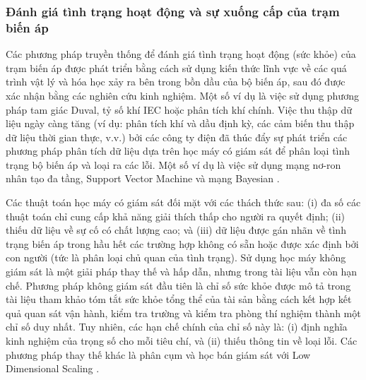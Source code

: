 \documentclass[utf8]{frontiersSCNS} %
\begin{document}
\subsubsection{Đánh giá tình trạng hoạt động và sự xuống cấp của trạm biến áp}

Các phương pháp truyền thống để đánh giá tình trạng hoạt động (sức khỏe) của trạm biến áp được phát triển bằng cách sử dụng kiến thức lĩnh vực về các quá trình vật lý và hóa học xảy ra bên trong bồn dầu của bộ biến áp, sau đó được xác nhận bằng các nghiên cứu kinh nghiệm. Một số ví dụ là việc sử dụng phương pháp tam giác Duval, tỷ số khí IEC hoặc phân tích khí chính. Việc thu thập dữ liệu ngày càng tăng (ví dụ: phân tích khí và dầu định kỳ, các cảm biến thu thập dữ liệu thời gian thực, v.v.) bởi các công ty điện đã thúc đẩy sự phát triển các phương pháp phân tích dữ liệu dựa trên học máy có giám sát để phân loại tình trạng bộ biến áp và loại ra các lỗi. Một số ví dụ là việc sử dụng mạng nơ-ron nhân tạo đa tầng, Support Vector Machine và mạng Bayesian . %

Các thuật toán học máy có giám sát đối mặt với các thách thức sau: (i) đa số các thuật toán chỉ cung cấp khả năng giải thích thấp cho người ra quyết định; (ii) thiếu dữ liệu về sự cố có chất lượng cao; và (iii) dữ liệu được gán nhãn về tình trạng biến áp trong hầu hết các trường hợp không có sẵn hoặc được xác định bởi con người (tức là phân loại chủ quan của tình trạng). Sử dụng học máy không giám sát là một giải pháp thay thế và hấp dẫn, nhưng trong tài liệu vẫn còn hạn chế. Phương pháp không giám sát đầu tiên là chỉ số sức khỏe được mô tả trong tài liệu tham khảo \citep{Jahromi2009} tóm tắt sức khỏe tổng thể của tài sản bằng cách kết hợp kết quả quan sát vận hành, kiểm tra trường và kiểm tra phòng thí nghiệm thành một chỉ số duy nhất. Tuy nhiên, các hạn chế chính của chỉ số này là: (i) định nghĩa kinh nghiệm của trọng số cho mỗi tiêu chí, và (ii) thiếu thông tin về loại lỗi. Các phương pháp thay thế khác là phân cụm \citep{Islam2016} và học bán giám sát với Low Dimensional Scaling \citep{Mirowski2012}.%
\end{document}
